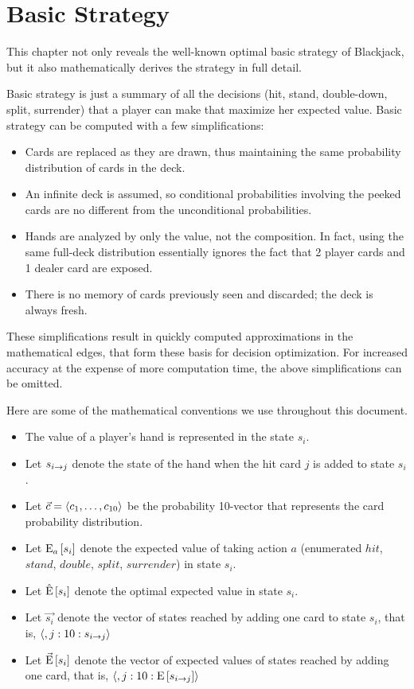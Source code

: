 
\chapter{Basic Strategy}
\label{sec:basic}

This chapter not only reveals the well-known optimal basic strategy
of Blackjack, but it also mathematically derives the strategy 
in full detail.  

Basic strategy is just a summary of all the decisions 
(hit, stand, double-down, split, surrender) that a player can 
make that maximize her expected value.  
Basic strategy can be computed with a few simplifications:
\begin{itemize}
\item Cards are replaced as they are drawn, thus maintaining the same
	probability distribution of cards in the deck.
\item An infinite deck is assumed, so conditional probabilities
	involving the peeked cards are no different from
	the unconditional probabilities.
\item Hands are analyzed by only the value, not the composition.
	In fact, using the same full-deck distribution essentially
	ignores the fact that 2 player cards and 1 dealer card
	are exposed.
\item There is no memory of cards previously seen and discarded; 
	the deck is always fresh.
\end{itemize}

\noindent
These simplifications result in quickly computed approximations in the
mathematical edges, that form these basis for decision optimization.  
For increased accuracy at the expense of more computation time,
the above simplifications can be omitted.

Here are some of the mathematical conventions we use
throughout this document.

\begin{itemize}
\item The value of a player's hand is represented in the state $s_i$.
\item Let $s_{i\rightarrow{}j}$ denote the state of the hand
when the hit card $j$ is added to state $s_i$.
\item Let $\vec{c}=\langle c_1, \ldots, c_{10}\rangle$ be the probability 10-vector
	that represents the card probability distribution.
\item Let $\textrm{E}_{a}\left[s_i\right]$ denote the expected value of taking action
$a$ (enumerated $hit$, $stand$, $double$, $split$, $surrender$) in state $s_i$.
\item Let $\hat{\textrm{E}}\left[s_i\right]$ denote the optimal expected value in state $s_i$.
\item Let $\Vec{s_i}$ denote the vector of states reached by adding 
	one card to state $s_i$, that is, $\langle,j:10: s_{i\rightarrow{}j}\rangle$
\item Let $\vec{\textrm{E}}\left[s_i\right]$ denote the vector of expected values of 
	states reached by adding one card, that is, 
	$\langle,j:10: \textrm{E}\left[s_{i\rightarrow{}j}\right]\rangle$
\end{itemize}

